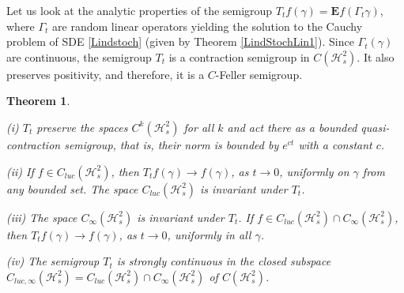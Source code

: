 \documentclass[12pt]{article}
\def\HC{\mathcal{H}}
\def\E{\mathbf{E}}
\def\ga{\gamma}
\newtheorem{theorem}{Theorem}[section]
\newcommand{\Ga}{\Gamma}
\begin{document}
Let us look at the analytic properties of the semigroup $T_tf(\ga)=\E f(\Ga_t \ga)$,
where $\Ga_t$ are random linear operators yielding the solution
to the Cauchy problem of SDE \eqref{Lindstoch} (given by Theorem \ref{LindStochLin1}).
Since $\Ga_t(\ga)$ are continuous, the semigroup $T_t$ is a contraction semigroup in $C(\HC^2_s)$.
It also preserves positivity, and therefore, it is a $C$-Feller semigroup.

\begin{theorem}
\label{Linsdesem}

(i) $T_t$ preserve the spaces $C^k(\HC^2_s)$ for all $k$ and act there as a bounded quasi-contraction semigroup,
that is, their norm is bounded by $e^{ct}$ with a constant $c$.

(ii) If $f\in C_{luc}(\HC^2_s)$, then $T_tf(\ga) \to f(\ga)$, as $t\to 0$,
uniformly on $\ga$ from any bounded set. The space $C_{luc}(\HC^2_s)$ is invariant under $T_t$.

(iii) The space $C_{\infty}(\HC^2_s)$ is invariant under $T_t$.
If $f\in C_{luc}(\HC^2_s)\cap C_{\infty}(\HC^2_s)$,
then $T_tf(\ga) \to f(\ga)$, as $t\to 0$, uniformly in all $\ga$.

(iv) The semigroup $T_t$ is strongly continuous in the closed subspace
$C_{luc, \infty}(\HC^2_s)= C_{luc}(\HC^2_s)\cap C_{\infty}(\HC^2_s)$
of $C(\HC^2_s)$.
\end{theorem}
\end{document}
